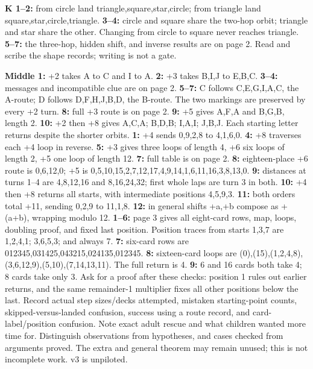 \documentclass[12pt]{extarticle}
\begin{document}
\newpage
{}
\textbf{K 1--2:} from circle land triangle,square,star,circle; from triangle land square,star,circle,triangle. \textbf{3--4:} circle and square share the two-hop orbit; triangle and star share the other. Changing from circle to square never reaches triangle. \textbf{5--7:} the three-hop, hidden shift, and inverse results are on page 2. Read and scribe the shape records; writing is not a gate.\par
\textbf{Middle 1:} +2 takes A to C and I to A. \textbf{2:} +3 takes B,I,J to E,B,C. \textbf{3--4:} messages and incompatible clue are on page 2. \textbf{5--7:} C follows C,E,G,I,A,C, the A-route; D follows D,F,H,J,B,D, the B-route. The two markings are preserved by every +2 turn. \textbf{8:} full +3 route is on page 2. \textbf{9:} +5 gives A,F,A and B,G,B, length 2. \textbf{10:} +2 then +8 gives A,C,A; B,D,B; I,A,I; J,B,J. Each starting letter returns despite the shorter orbits.
\textbf{1:} +4 sends 0,9,2,8 to 4,1,6,0. \textbf{4:} +8 traverses each +4 loop in reverse. \textbf{5:} +3 gives three loops of length 4, +6 six loops of length 2, +5 one loop of length 12. \textbf{7:} full table is on page 2. \textbf{8:} eighteen-place +6 route is 0,6,12,0; +5 is 0,5,10,15,2,7,12,17,4,9,14,1,6,11,16,3,8,13,0. \textbf{9:} distances at turns 1--4 are 4,8,12,16 and 8,16,24,32; first whole laps are turn 3 in both. \textbf{10:} +4 then +8 returns all starts, with intermediate positions 4,5,9,3. \textbf{11:} both orders total +11, sending 0,2,9 to 11,1,8. \textbf{12:} in general shifts +a,+b compose as +(a+b), wrapping modulo 12.
\textbf{1--6:} page 3 gives all eight-card rows, map, loops, doubling proof, and fixed last position. Position traces from starts 1,3,7 are 1,2,4,1; 3,6,5,3; and always 7. \textbf{7:} six-card rows are 012345,031425,043215,024135,012345. \textbf{8:} sixteen-card loops are (0),(15),(1,2,4,8),(3,6,12,9),(5,10),(7,14,13,11). The full return is 4. \textbf{9:} 6 and 16 cards both take 4; 8 cards take only 3. Ask for a proof after these checks: position 1 rules out earlier returns, and the same remainder-1 multiplier fixes all other positions below the last.
Record actual step sizes/decks attempted, mistaken starting-point counts, skipped-versus-landed confusion, success using a route record, and card-label/position confusion. Note exact adult rescue and what children wanted more time for. Distinguish observations from hypotheses, and cases checked from arguments proved. The extra and general theorem may remain unused; this is not incomplete work. v3 is unpiloted.
\end{document}

